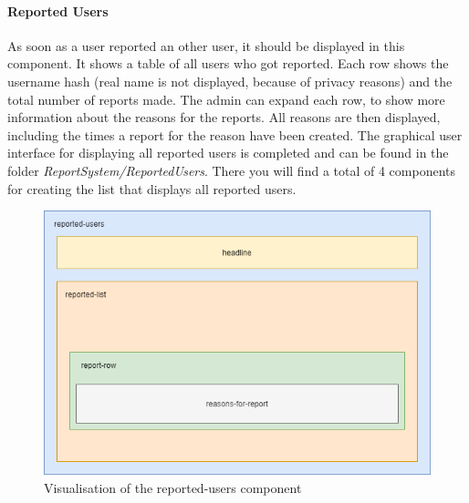 \paragraph{Reported Users}
As soon as a user reported an other user, it should be displayed in this component.
It shows a table of all users who got reported.
Each row shows the username hash (real name is not displayed, because of privacy reasons) and the total number of
reports made.
The admin can expand each row, to show more information about the reasons for the reports.
All reasons are then displayed, including the times a report for the reason have been created.
The graphical user interface for displaying all reported users is completed and can be found in the folder
\textit{ReportSystem/ReportedUsers}.
There you will find a total of 4 components for creating the list that displays all reported users.

\begin{figure}[H]
    \centering
    \includegraphics[width=1.0\textwidth]{./images/report_component}
    \caption{Visualisation of the reported-users component}
    \label{fig:reportedusers}
\end{figure}

